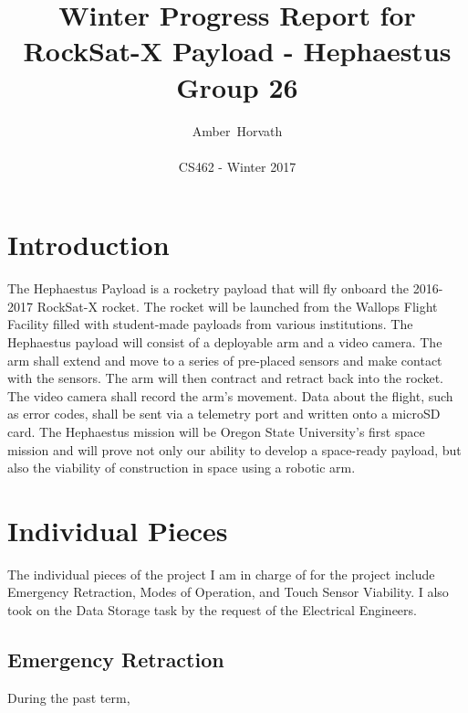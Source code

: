 \documentclass[letterpaper,10pt]{article}
\title{Winter Progress Report for RockSat-X Payload - Hephaestus \\ Group 26}
\author{Amber~Horvath\\ \\ CS462 - Winter 2017}
\begin{document}
\maketitle

\section{Introduction}
The Hephaestus Payload is a rocketry payload that will fly onboard the 2016-2017 RockSat-X rocket. 
The rocket will be launched from the Wallops Flight Facility filled with student-made payloads from 
various institutions. The Hephaestus payload will consist of a deployable arm and a video camera.
The arm shall extend and move to a series of pre-placed sensors and make contact with the sensors. 
The arm will then contract and retract back into the rocket.
The video camera shall record the arm's movement. Data about the flight, such as error codes, shall be sent via a telemetry port and written onto a microSD card.
The Hephaestus mission will be Oregon State University's first space mission and will prove not only
our ability to develop a space-ready payload, but also the viability of construction in space using a robotic
arm.

\section{Individual Pieces}
The individual pieces of the project I am in charge of for the project include Emergency Retraction, 
Modes of Operation, and Touch Sensor Viability. I also took on the Data Storage task by the request
of the Electrical Engineers.
\subsection{Emergency Retraction}
During the past term, 
\end{document}
